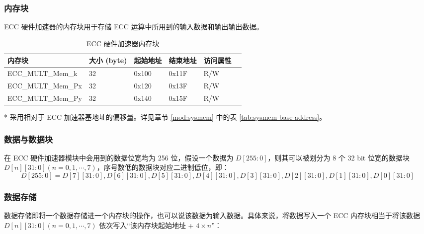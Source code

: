 \documentclass[main\_\_CN.tex]{subfiles}
\begin{document}
\subsubsection{内存块}
ECC 硬件加速器的内存块用于存储 ECC 运算中所用到的输入数据和输出输出数据。
\begin{table}[H]
    \centering
    \caption{ECC 硬件加速器内存块} \label{tab:ecc-memory}
    \begin{threeparttable}
    \begin{tabular}{ | l | l | l | l | l | l | }
    \hline
        \rowcolor{lightgray}
        \textbf{内存块} & \textbf{大小 (byte)}  &  \textbf{起始地址}\tnote{*} &  \textbf{结束地址} \tnote{*} & \textbf{访问属性}   \\ \hline
        ECC\_MULT\_Mem\_k    & 32  & 0x100 & 0x11F & R/W \\ \hline
        ECC\_MULT\_Mem\_Px   & 32  & 0x120 & 0x13F & R/W \\ \hline
        ECC\_MULT\_Mem\_Py   & 32  & 0x140 & 0x15F & R/W \\ \hline
    \end{tabular}
    \begin{tablenotes}
        \item[*] 采用相对于 ECC 加速器基地址的偏移量。详见章节 \ref{mod:sysmem} \textit{} 中的表 \ref{tab:sysmem-base-address}。
    \end{tablenotes}
    \end{threeparttable}
\end{table}

\subsubsection{数据与数据块}

在 ECC 硬件加速器模块中会用到的数据位宽均为 256 位，假设一个数据为 $D[255:0]$，则其可以被划分为 8 个 32 bit 位宽的数据块 $D[n][31:0](n=0,1,\cdots,7)$，序号数低的数据块对应二进制低位，即：
\[
D[255:0] = {D[7][31:0],D[6][31:0],D[5][31:0],
D[4][31:0],D[3][31:0],D[2][31:0],D[1][31:0],D[0][31:0]}
\]

\subsubsection{数据存储}

数据存储即将一个数据存储进一个内存块的操作，也可以说该数据为输入数据。具体来说，将数据写入一个 ECC 内存块相当于将该数据 $D[n][31:0] (n=0, 1, \cdots, 7)$ 依次写入“该内存块起始地址 + $
4 \times n$”：
\end{document}
